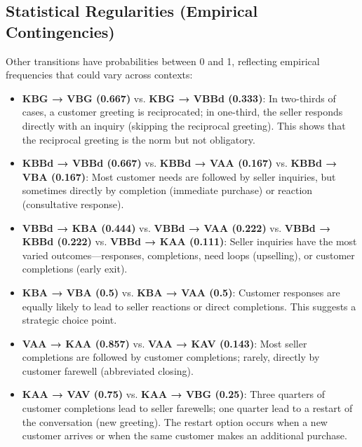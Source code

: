 \documentclass[12pt,a4paper]{article}
\begin{document}
\subsection{Statistical Regularities (Empirical Contingencies)}

Other transitions have probabilities between 0 and 1, reflecting empirical
frequencies that could vary across contexts:

\begin{itemize}
    \item \textbf{KBG → VBG (0.667)} vs. \textbf{KBG → VBBd (0.333)}: In
    two-thirds of cases, a customer greeting is reciprocated; in one-third,
    the seller responds directly with an inquiry (skipping the reciprocal
    greeting). This shows that the reciprocal greeting is the norm but not
    obligatory.
    
    \item \textbf{KBBd → VBBd (0.667)} vs. \textbf{KBBd → VAA (0.167)} vs.
    \textbf{KBBd → VBA (0.167)}: Most customer needs are followed by seller
    inquiries, but sometimes directly by completion (immediate purchase)
    or reaction (consultative response).
    
    \item \textbf{VBBd → KBA (0.444)} vs. \textbf{VBBd → VAA (0.222)} vs.
    \textbf{VBBd → KBBd (0.222)} vs. \textbf{VBBd → KAA (0.111)}: Seller
    inquiries have the most varied outcomes—responses, completions, need
    loops (upselling), or customer completions (early exit).
    
    \item \textbf{KBA → VBA (0.5)} vs. \textbf{KBA → VAA (0.5)}: Customer
    responses are equally likely to lead to seller reactions or direct
    completions. This suggests a strategic choice point.
    
    \item \textbf{VAA → KAA (0.857)} vs. \textbf{VAA → KAV (0.143)}: Most
    seller completions are followed by customer completions; rarely,
    directly by customer farewell (abbreviated closing).
    
    \item \textbf{KAA → VAV (0.75)} vs. \textbf{KAA → VBG (0.25)}: Three
    quarters of customer completions lead to seller farewells; one quarter
    lead to a restart of the conversation (new greeting). The restart option
    occurs when a new customer arrives or when the same customer makes
    an additional purchase.
\end{itemize}
\end{document}
